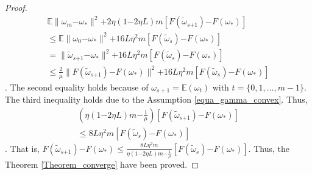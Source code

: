 \documentclass[letterpaper]{article}
\begin{document}
\begin{proof}
\begin{equation}
\begin{array}{ll}
\mathbb{E}\parallel  \omega_{m}\mathrm{-}\omega_\ast \parallel^2  \mathrm{+} 2\eta(1\mathrm{-}2\eta L) m [F(\tilde{\omega}_{s\mathrm{+}1}) \mathrm{-} F(\omega_\ast) ] \\
\le \mathbb{E}\parallel  \omega_{0}\mathrm{-}\omega_\ast  \parallel^2 \mathrm{+} 16 L \eta^2 m [F(\tilde{\omega}_s)\mathrm{-}F(\omega_\ast)] \\ 
= \parallel  \tilde{\omega}_{s\mathrm{+}1}\mathrm{-}\omega_\ast  \parallel^2 \mathrm{+} 16 L \eta^2 m [F(\tilde{\omega}_s)\mathrm{-}F(\omega_\ast)] \\ 
\le \frac{2}{\mu}\parallel  F(\tilde{\omega}_{s\mathrm{+}1}) \mathrm{-}  F(\omega_\ast)  \parallel^2 \mathrm{+} 16 L \eta^2 m [F(\tilde{\omega}_s)\mathrm{-}F(\omega_\ast)]
\end{array} 
\end{equation}. The second equality holds because of $\omega_{s+1}  = \mathbb{E}( \omega_t )$ with $t=\{0,1, ..., m-1\}$. The third inequality holds due to the Assumption \ref{equa_gamma_convex}.
Thus, 
\begin{equation}
\begin{array}{ll}
\left ( \eta(1\mathrm{-}2\eta L) m  \mathrm{-}  \frac{1}{\mu}   \right  ) [F(\tilde{\omega}_{s\mathrm{+}1}) \mathrm{-} F(\omega_\ast) ] \\
\le 8 L \eta^2 m [F(\tilde{\omega}_s)\mathrm{-}F(\omega_\ast)]
\end{array} 
\end{equation}. That is, $
F(\tilde{\omega}_{s\mathrm{+}1}) \mathrm{-} F(\omega_\ast)  \le \frac{8 L \eta^2 m}{ \eta(1\mathrm{-}2\eta L) m  \mathrm{-}  \frac{1}{\mu}    } [F(\tilde{\omega}_s)\mathrm{-}F(\omega_\ast)]
$. Thus, the Theorem \ref{Theorem_converge} have been proved.
\end{proof}
\end{document}
